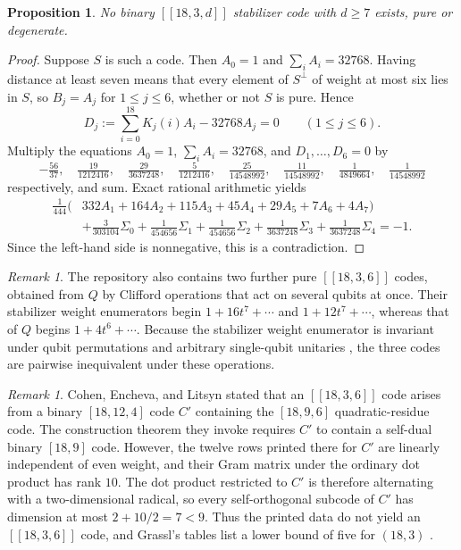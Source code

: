 \documentclass[11pt]{article}
\newtheorem{proposition}[theorem]{Proposition}
\theoremstyle{definition}
\theoremstyle{remark}
\newtheorem{remark}[theorem]{Remark}
\newcommand{\qc}[1]{[\![#1]\!]}
\begin{document}
\begin{proposition}\label{prop:ub18}
No binary \(\qc{18,3,d}\) stabilizer code with \(d\geq7\) exists, pure
or degenerate.
\end{proposition}
\begin{proof}
Suppose \(S\) is such a code. Then \(A_0=1\) and \(\sum_iA_i=32768\).
Having distance at least seven means that every element of \(S^\perp\)
of weight at most six lies in \(S\), so \(B_j=A_j\) for \(1\leq j\leq6\),
whether or not \(S\) is pure. Hence
\[
 D_j:=\sum_{i=0}^{18}K_j(i)A_i-32768A_j=0\qquad(1\leq j\leq6).
\]
Multiply the equations \(A_0=1\), \(\sum_iA_i=32768\), and
\(D_1,\ldots,D_6=0\) by
\[
 -\tfrac{56}{37},\quad \tfrac{19}{1212416},\quad
 \tfrac{29}{3637248},\quad \tfrac{5}{1212416},\quad
 \tfrac{25}{14548992},\quad \tfrac{11}{14548992},\quad
 \tfrac{1}{4849664},\quad \tfrac{1}{14548992}
\]
respectively, and sum. Exact rational arithmetic yields
\[
 \begin{aligned}
 \tfrac{1}{444}\bigl(&332A_1+164A_2+115A_3+45A_4+29A_5+7A_6+4A_7\bigr)\\
 &+\tfrac{3}{303104}\Sigma_0+\tfrac{1}{454656}\Sigma_1+\tfrac{1}{454656}\Sigma_2
 +\tfrac{1}{3637248}\Sigma_3+\tfrac{1}{3637248}\Sigma_4=-1.
 \end{aligned}
\]
Since the left-hand side is nonnegative, this is a contradiction.
\end{proof}

\begin{remark}\label{rem:BC}
The repository also contains two further pure \(\qc{18,3,6}\) codes,
obtained from \(Q\) by Clifford operations that act on several qubits at
once. Their stabilizer weight enumerators begin \(1+16t^7+\cdots\) and
\(1+12t^7+\cdots\), whereas that of \(Q\) begins \(1+4t^6+\cdots\).
Because the stabilizer weight enumerator is invariant under qubit
permutations and arbitrary single-qubit unitaries \cite{rains98}, the
three codes are pairwise inequivalent under these operations.
\end{remark}

\begin{remark}\label{rem:cel}
Cohen, Encheva, and Litsyn \cite[Example~1]{cel} stated that an
\(\qc{18,3,6}\) code arises from a binary \([18,12,4]\) code \(C'\)
containing the \([18,9,6]\) quadratic-residue code. The construction
theorem they invoke requires \(C'\) to contain a self-dual binary
\([18,9]\) code. However, the twelve rows printed there for \(C'\) are
linearly independent of even weight, and their Gram matrix under the
ordinary dot product has rank \(10\). The dot product restricted to
\(C'\) is therefore alternating with a two-dimensional radical, so every
self-orthogonal subcode of \(C'\) has dimension at most
\(2+10/2=7<9\). Thus the printed data do not yield an \(\qc{18,3,6}\)
code, and Grassl's tables list a lower bound of five for \((18,3)\)
\cite{grassl}.
\end{remark}
\end{document}
